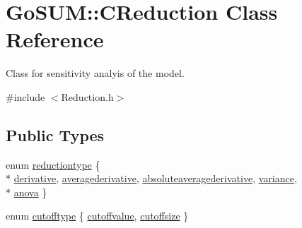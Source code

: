 \hypertarget{class_go_s_u_m_1_1_c_reduction}{\section{Go\-S\-U\-M\-:\-:C\-Reduction Class Reference}
\label{class_go_s_u_m_1_1_c_reduction}
}


Class for sensitivity analyis of the model.  




{\ttfamily \#include $<$Reduction.\-h$>$}

\subsection*{Public Types}
\begin{DoxyCompactItemize}
\item 
enum \hyperlink{class_go_s_u_m_1_1_c_reduction_a191434138cff8df283fa2c2e2a8e653a}{reductiontype} \{ \\*
\hyperlink{class_go_s_u_m_1_1_c_reduction_a191434138cff8df283fa2c2e2a8e653aa952f6fb0a6d95a1676b4d6066f52270e}{derivative}, 
\hyperlink{class_go_s_u_m_1_1_c_reduction_a191434138cff8df283fa2c2e2a8e653aaa3432d27df8cf02f515b1e454c8c7924}{averagederivative}, 
\hyperlink{class_go_s_u_m_1_1_c_reduction_a191434138cff8df283fa2c2e2a8e653aa721664e8924d9da413e3b6bb590eebf2}{absoluteaveragederivative}, 
\hyperlink{class_go_s_u_m_1_1_c_reduction_a191434138cff8df283fa2c2e2a8e653aa2a375ae8e1798313779934ce63f48269}{variance}, 
\\*
\hyperlink{class_go_s_u_m_1_1_c_reduction_a191434138cff8df283fa2c2e2a8e653aabfaf94cdc880e3a32c6e26225e2a093f}{anova}
 \}
\item 
enum \hyperlink{class_go_s_u_m_1_1_c_reduction_aa520ced4c505a26533dd1787c8055f7b}{cutofftype} \{ \hyperlink{class_go_s_u_m_1_1_c_reduction_aa520ced4c505a26533dd1787c8055f7bac403bda7019ba0d07c05cbd3cf2599db}{cutoffvalue}, 
\hyperlink{class_go_s_u_m_1_1_c_reduction_aa520ced4c505a26533dd1787c8055f7ba6b9e36f006d84d1f1017d22915de09b0}{cutoffsize}
 \}
\end{DoxyCompactItemize}
